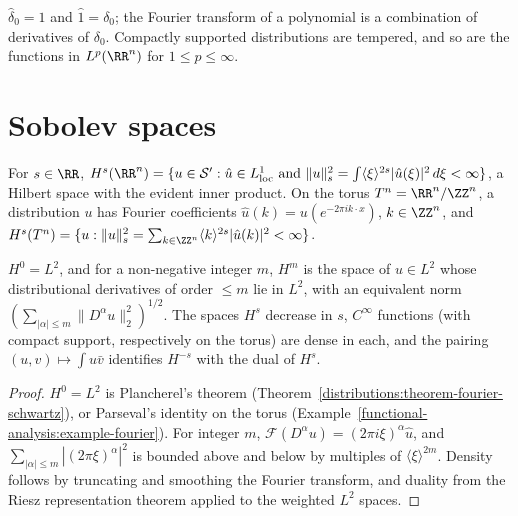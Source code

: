 \begin{example}\label{distributions:example-fourier-delta}
$\hat\delta_0 = 1$ and $\hat 1 = \delta_0$; the Fourier transform of a polynomial is a combination of derivatives of $\delta_0$. Compactly supported distributions are tempered, and so are the functions in
$L^p(\RR^n)$ for $1 \leq p \leq \infty$.
\end{example}

\section{Sobolev spaces}\label{distributions:section-sobolev}

\begin{definition}\label{distributions:definition-sobolev}
For $s \in \RR$, $H^s(\RR^n) = \{u \in \mathcal{S}' : \hat u \in L^1_{\mathrm{loc}} \text{ and } \|u\|_s^2 = \int\langle\xi\rangle^{2s}|\hat u(\xi)|^2\,d\xi < \infty\}$, a Hilbert space with the evident inner
product. On the torus $T^n = \RR^n/\ZZ^n$, a distribution $u$ has Fourier coefficients $\hat u(k) = u(e^{-2\pi ik\cdot x})$, $k \in \ZZ^n$, and
$H^s(T^n) = \{u : \|u\|_s^2 = \sum_{k \in \ZZ^n}\langle k \rangle^{2s}|\hat u(k)|^2 < \infty\}$.
\end{definition}

\begin{proposition}\label{distributions:proposition-sobolev-basic}
$H^0 = L^2$, and for a non-negative integer $m$, $H^m$ is the space of $u \in L^2$ whose distributional derivatives of order $\leq m$ lie in $L^2$, with an equivalent norm
$(\sum_{|\alpha| \leq m}\|D^\alpha u\|_2^2)^{1/2}$. The spaces $H^s$ decrease in $s$, $C^\infty$ functions (with compact support, respectively on the torus) are dense in each, and the pairing
$(u, v) \mapsto \int u\bar v$ identifies $H^{-s}$ with the dual of $H^s$.
\end{proposition}

\begin{proof}
$H^0 = L^2$ is Plancherel's theorem (Theorem~\ref{distributions:theorem-fourier-schwartz}), or Parseval's identity on the torus (Example~\ref{functional-analysis:example-fourier}). For integer $m$,
$\mathcal{F}(D^\alpha u) = (2\pi i\xi)^\alpha\hat u$, and $\sum_{|\alpha| \leq m}|(2\pi\xi)^\alpha|^2$ is bounded above and below by multiples of $\langle\xi\rangle^{2m}$. Density follows by truncating and
smoothing the Fourier transform, and duality from the Riesz representation theorem applied to the weighted $L^2$ spaces.
\end{proof}

